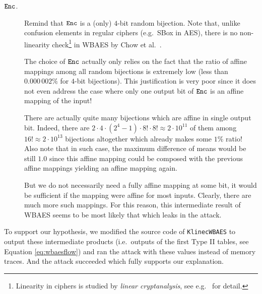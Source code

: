 \begin{description}
	\item[$\texttt{Enc}$.] Remind that $\texttt{Enc}$ is a (only) $4$-bit random bijection. Note that, unlike confusion elements in regular ciphers (e.g.\ SBox in AES), there is no non-linearity check\footnote{Linearity in ciphers is studied by {\em linear cryptanalysis}, see e.g.\ \cite{matsui1993linear} for detail.} in WBAES by Chow et al.\ \cite{chow2002aes}.
	
	The choice of $\texttt{Enc}$ actually only relies on the fact that the ratio of affine mappings among all random bijections is extremely low (less than $0.000\,002\%$ for $4$-bit bijections). This justification is very poor since it does not even address the case where only one output bit of $\texttt{Enc}$ is an affine mapping of the input!
	
	There are actually quite many bijections which are affine in single output bit. Indeed, there are $2\cdot4\cdot(2^4-1)\cdot8!\cdot8! \approx 2\cdot10^{11}$ of them among $16! \approx 2\cdot10^{13}$ bijections altogether which already makes some $1\%$ ratio! Also note that in such case, the maximum difference of means would be still $1.0$ since this affine mapping could be composed with the previous affine mappings yielding an affine mapping again.
	
	But we do not necessarily need a fully affine mapping at some bit, it would be sufficient if the mapping were affine for most inputs. Clearly, there are much more such mappings. For this reason, this intermediate result of WBAES seems to be most likely that which leaks in the attack.
\end{description}

To support our hypothesis, we modified the source code of {\tt KlinecWBAES} to output these intermediate products (i.e.\ outputs of the first Type II tables, see Equation \ref{eq:wbaesflow}) and ran the attack with these values instead of memory traces. And the attack succeeded which fully supports our explanation.


